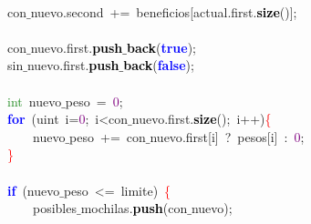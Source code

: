 \mbox{}\ \ \ \ \ \ \ \ \ \ \ \  \\
\mbox{}\ \ \ \ \ \ \ \ \ \ \ \ con$\_$nuevo\textcolor{BrickRed}{.}second\ \textcolor{BrickRed}{+=}\ beneficios\textcolor{BrickRed}{[}actual\textcolor{BrickRed}{.}first\textcolor{BrickRed}{.}\textbf{\textcolor{Black}{size}}\textcolor{BrickRed}{()];} \\
\mbox{}\ \ \ \ \ \ \ \ \ \ \ \  \\
\mbox{}\ \ \ \ \ \ \ \ \ \ \ \ con$\_$nuevo\textcolor{BrickRed}{.}first\textcolor{BrickRed}{.}\textbf{\textcolor{Black}{push$\_$back}}\textcolor{BrickRed}{(}\textbf{\textcolor{Blue}{true}}\textcolor{BrickRed}{);} \\
\mbox{}\ \ \ \ \ \ \ \ \ \ \ \ sin$\_$nuevo\textcolor{BrickRed}{.}first\textcolor{BrickRed}{.}\textbf{\textcolor{Black}{push$\_$back}}\textcolor{BrickRed}{(}\textbf{\textcolor{Blue}{false}}\textcolor{BrickRed}{);} \\
\mbox{}\ \ \ \ \ \ \ \ \ \ \ \  \\
\mbox{}\ \ \ \ \ \ \ \ \ \ \ \ \textcolor{ForestGreen}{int}\ nuevo$\_$peso\ \textcolor{BrickRed}{=}\ \textcolor{Purple}{0}\textcolor{BrickRed}{;} \\
\mbox{}\ \ \ \ \ \ \ \ \ \ \ \ \textbf{\textcolor{Blue}{for}}\ \textcolor{BrickRed}{(}\textcolor{TealBlue}{uint}\ i\textcolor{BrickRed}{=}\textcolor{Purple}{0}\textcolor{BrickRed}{;}\ i\textcolor{BrickRed}{\textless{}}con$\_$nuevo\textcolor{BrickRed}{.}first\textcolor{BrickRed}{.}\textbf{\textcolor{Black}{size}}\textcolor{BrickRed}{();}\ i\textcolor{BrickRed}{++)}\textcolor{Red}{\{} \\
\mbox{}\ \ \ \ \ \ \ \ \ \ \ \ \ \ \ \ nuevo$\_$peso\ \textcolor{BrickRed}{+=}\ con$\_$nuevo\textcolor{BrickRed}{.}first\textcolor{BrickRed}{[}i\textcolor{BrickRed}{]}\ \textcolor{BrickRed}{?}\ pesos\textcolor{BrickRed}{[}i\textcolor{BrickRed}{]}\ \textcolor{BrickRed}{:}\ \textcolor{Purple}{0}\textcolor{BrickRed}{;} \\
\mbox{}\ \ \ \ \ \ \ \ \ \ \ \ \textcolor{Red}{\}} \\
\mbox{} \\
\mbox{}\ \ \ \ \ \ \ \ \ \ \ \ \textbf{\textcolor{Blue}{if}}\ \textcolor{BrickRed}{(}nuevo$\_$peso\ \textcolor{BrickRed}{\textless{}=}\ limite\textcolor{BrickRed}{)}\ \textcolor{Red}{\{} \\
\mbox{}\ \ \ \ \ \ \ \ \ \ \ \ \ \ \ \ posibles$\_$mochilas\textcolor{BrickRed}{.}\textbf{\textcolor{Black}{push}}\textcolor{BrickRed}{(}con$\_$nuevo\textcolor{BrickRed}{);} \\
